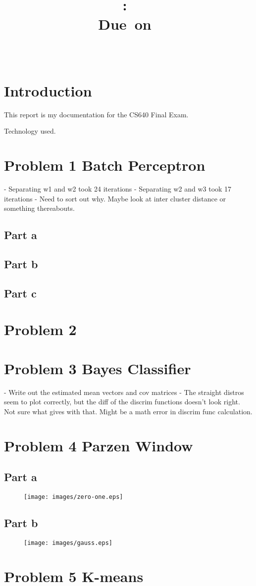 \documentclass{article}
\title{\vspace{2in}\textmd{\textbf{\hmwkClass:\ \hmwkTitle\ifthenelse{\equal{\hmwkSubTitle}{}}{}{\\\hmwkSubTitle}}}\\\normalsize\vspace{0.1in}\small{Due\ on\ \hmwkDueDate}\\\vspace{0.1in}\large{\textit{\hmwkClassInstructor\ \hmwkClassTime}}\vspace{3in}}
\date{}
\author{\textbf{\hmwkAuthorName}}
\begin{document}
\maketitle

\section*{Introduction}
This report is my documentation for the CS640 Final Exam.

Technology used.

\section*{Problem 1 Batch Perceptron}
- Separating w1 and w2 took 24 iterations
- Separating w2 and w3 took 17 iterations
- Need to sort out why.  Maybe look at inter cluster distance or
  something thereabouts.

\subsection*{Part a}
\subsection*{Part b}
\subsection*{Part c}

\section*{Problem 2}

\section*{Problem 3 Bayes Classifier}
- Write out the estimated mean vectors and cov matrices
- The straight distros seem to plot correctly, but the diff
  of the discrim functions doesn't look right.  Not sure
  what gives with that.  Might be a math error in discrim
  func calculation.

\section*{Problem 4 Parzen Window}
\subsection*{Part a}
\begin{figure}
  \texttt{[image: images/zero-one.eps]}
  \label{fig:zero-one-parzen}
\end{figure}

\subsection*{Part b}
\begin{figure}
  \texttt{[image: images/gauss.eps]}
  \label{fig:gauss-parzen}
  \end{figure}

\section*{Problem 5 K-means}
\end{document}
